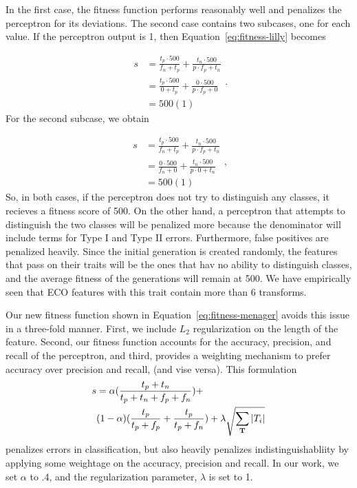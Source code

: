 \documentclass[conference]{IEEEtran}
\begin{document}
In the first case, the fitness function performs reasonably well and penalizes the perceptron for its deviations. The second case contains two subcases, one for each value. If the perceptron output is 1, then Equation~\ref{eq:fitness-lilly} becomes

\begin{equation}
  \begin{split}
    s & = \frac{t_p \cdot 500}{f_n + t_p} + \frac{t_n \cdot 500}{p \cdot f_p+ t_n}\\
    & = \frac{t_p \cdot 500}{0 + t_p} + \frac{0 \cdot 500}{p \cdot f_p + 0}\\
    & = 500(1)
  \end{split}.
  \label{eq:fitness-lilly-decompose}
\end{equation}
For the second subcase, we obtain

\begin{equation}
  \begin{split}
    s & = \frac{t_p \cdot 500}{f_n + t_p} + \frac{t_n \cdot 500}{p \cdot f_p+ t_n}\\
    & = \frac{0 \cdot 500}{f_n + 0} + \frac{t_n \cdot 500}{p \cdot 0 + t_n}\\
    & = 500(1)
  \end{split},
  \label{eq:fitness-lilly-decompose2}
\end{equation}
So, in both cases, if the perceptron does not try to distinguish any classes, it recieves a fitness score of 500. On the other hand, a perceptron that attempts to distinguish the two classes will be penalized more because the denominator will include terms for Type I and Type II errors. Furthermore, false positives are penalized heavily. Since the initial generation is created randomly, the features that pass on their traits will be the ones that hav no ability to distinguish classes, and the average fitness of the generations will remain at 500. We have empirically seen that ECO features with this trait contain more than 6 transforms.

Our new fitness function shown in Equation~\ref{eq:fitness-menager} avoids this issue in a three-fold manner. First, we include $L_2$ regularization on the length of the feature. Second, our fitness function accounts for the accuracy, precision, and recall of the perceptron, and third, provides a weighting mechanism to prefer accuracy over precision and recall, (and vise versa). This formulation
\begin{equation}
  \begin{split}
    s & = \alpha(\frac{t_p + t_n}{t_p + t_n + f_p + f_n}) +\\
    &(1 - \alpha)(\frac{t_p}{t_p + f_p} + \frac{t_p}{t_p + f_n}) + \lambda \sqrt{\sum_{\bf T} |T_i|}
    \end{split}
  \label{eq:fitness-menager}
\end{equation}
penalizes errors in classification, but also heavily penalizes indistinguishabliity by applying some weightage on the accuracy, precision and recall. In our work, we set $\alpha$ to .4, and the regularization parameter, $\lambda$ is set to 1.
\end{document}
